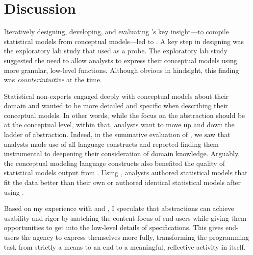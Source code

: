 \section{Discussion}
Iteratively designing, developing, and evaluating \tisane's key insight---to
compile statistical models from conceptual models---led to \rTisane. A key step
in designing \rTisane was the exploratory lab study that used \tisane as a
probe. The exploratory lab study suggested the need to allow analysts to express
their conceptual models using more granular, low-level functions. Although
obvious in hindsight, this finding was \textit{counterintuitive} at the time. 

 Statistical non-experts engaged deeply with conceptual models
about their domain and wanted to be more detailed and specific when describing
their conceptual models. In other words, while the focus on the abstraction
should be at the conceptual level, within that, analysts want to move up and
down the ladder of abstraction. Indeed, in the summative evaluation of \rTisane,
we saw that analysts made use of all language constructs and reported finding
them instrumental to deepening their consideration of domain knowledge.
Arguably, the conceptual modeling language constructs also benefited the quality
of statistical models output from \rTisane. Using \rTisane, analysts authored
statistical models that fit the data better than their own or authored identical
statistical models after using \rTisane.

Based on my experience with \tisane and \rTisane, I speculate that abstractions
can achieve usability and rigor by matching the content-focus of end-users while
giving them opportunities to get into the low-level details of specifications.
This gives end-users the agency to express themselves more fully, transforming
the programming task from strictly a means to an end to a meaningful, reflective
activity in itself. 


